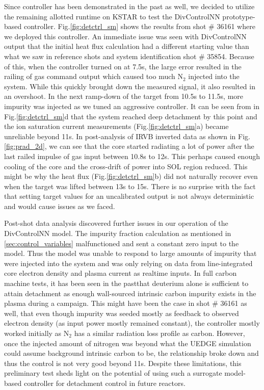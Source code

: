 Since \Afrac controller has been demonstrated in the past as well, we decided to utilize the remaining allotted runtime on KSTAR to test the DivControlNN prototype-based controller.
Fig.\ref{fig:detctrl_sm} shows the results from shot \# 36161 where we deployed this controller.
An immediate issue was seen with DivControlNN output that the initial heat flux calculation had a different starting value than what we saw in reference shots and system identification shot \# 35854.
Because of this, when the controller turned on at 7.5s, the large error resulted in the railing of gas command output which caused too much N$_2$ injected into the system.
While this quickly brought down the measured signal, it also resulted in an overshoot.
In the next ramp-down of the target from 10.5s to 11.5s, more impurity was injected as we tuned an aggressive controller.
It can be seen from \Afrac in Fig.\ref{fig:detctrl_sm}d that the system reached deep detachment by this point and the ion saturation current measurements (Fig.\ref{fig:detctrl_sm}a) became unreliable beyond 11s.
In post-analysis of IRVB inverted data as shown in Fig.\ref{fig:prad_2d}, we can see that the core started radiating a lot of power after the last railed impulse of gas input between 10.8s to 12s.
This perhaps caused enough cooling of the core and the cross-drift of power into \ac{SOL} region reduced.
This might be why the heat flux (Fig.\ref{fig:detctrl_sm}b) did not naturally recover even when the target was lifted between 13s to 15s.
There is no surprise with the fact that setting target values for an uncalibrated output is not always deterministic and would cause issues as we faced.

Post-shot data analysis discovered further issues in our operation of the DivControlNN model.
The impurity fraction calculation as mentioned in \ref{sec:control_variables} malfunctioned and sent a constant zero input to the model.
Thus the model was unable to respond to large amounts of impurity that were injected into the system and was only relying on data from line-integrated core electron density and plasma current as realtime inputs.
In full carbon machine tests, it has been seen in the past\needcite that deuterium alone is sufficient to attain detachment as enough wall-sourced intrinsic carbon impurity exists in the plasma during a campaign.
This might have been the case in shot \# 36161 as well, that even though impurity was seeded mostly as feedback to observed electron density (as input power mostly remained constant), the controller mostly worked initially as N$_2$ has a similar radiation loss profile as carbon.
However, once the injected amount of nitrogen was beyond what the UEDGE simulation could assume background intrinsic carbon to be, the relationship broke down and thus the control is not very good beyond 11s.
Despite these limitations, this preliminary test sheds light on the potential of using such a surrogate model-based controller for detachment control in future reactors.
